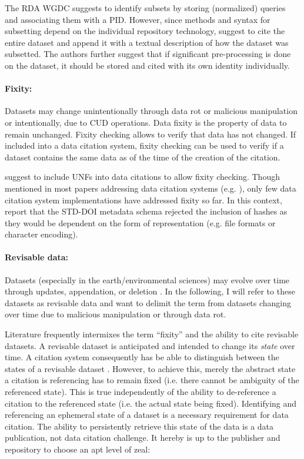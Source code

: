 \documentclass[letterpaper, parskip=half]{scrartcl}
\begin{document}
The \gls{RDA} \gls{WGDC} \citep{Rauber2015a, Rauber2015, Proll2013} suggests to identify subsets by storing (normalized) queries and associating them with a \gls{PID}. However, since methods and syntax for subsetting depend on the individual repository technology, \cite{AltKin07} suggest to cite the entire dataset and append it with a textual description of how the dataset was subsetted. The authors further suggest that if significant pre-processing is done on the dataset, it should be stored and cited with its own identity individually. 

\paragraph{Fixity:}
Datasets may change unintentionally through data rot or malicious manipulation or intentionally, due to \gls{CUD} operations. 
Data fixity is the property of data to remain unchanged. 
Fixity checking allows to verify that data has not changed.
If included into a data citation system, fixity checking can be used to verify if a dataset contains the same data as of the time of the creation of the citation.

\cite{AltKin07, Rauber2015} suggest to include \glspl{UNF} into data citations to allow fixity checking. Though mentioned in most papers addressing data citation systems (e.g. \citep{Buneman2016, Davidson2017}), only few data citation system implementations have addressed fixity so far. In this context, \cite{Klump2016} report that the STD-DOI metadata schema rejected the inclusion of hashes as they would be dependent on the form of representation (e.g. file formats or character encoding).

\paragraph{Revisable data:}
Datasets (especially in the earth/environmental sciences) may evolve over time through updates, appendation, or deletion \citep{Klump2016}. In the following, I will refer to these datasets as revisable data and want to delimit the term from datasets changing over time due to malicious manipulation or through data rot.

Literature frequently intermixes the term ``fixity'' and the ability to cite revisable datasets. A revisable dataset is anticipated and intended to change its \textit{state} over time. A citation system consequently has be able to distinguish between the states of a revisable dataset \citep{Rauber2015, Klump2016}. However, to achieve this, merely the abstract state a citation is referencing has to remain fixed (i.e. there cannot be ambiguity of the referenced state).
This is true independently of the ability to de-reference a citation to the referenced state (i.e. the actual state being fixed). Identifying and referencing an ephemeral state of a dataset is a necessary requirement for data citation. The ability to persistently retrieve this state of the data is a data publication, not data citation challenge. It hereby is up to the publisher and repository to choose an apt level of zeal:
\end{document}
